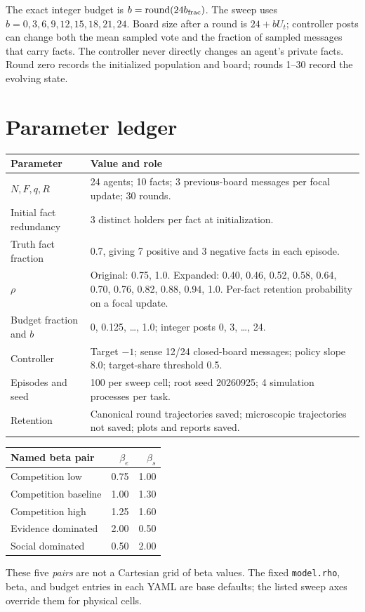 \documentclass[10pt,a4paper]{article}
\begin{document}
The exact integer budget is $b=\operatorname{round}(24b_{\rm frac})$. The sweep
uses $b=0,3,6,9,12,15,18,21,24$. Board size after a round is $24+bU_t$;
controller posts can change both the mean sampled vote and the fraction of
sampled messages that carry facts. The controller never directly changes an
agent's private facts. Round zero records the initialized population and
board; rounds 1--30 record the evolving state.

\section{Parameter ledger}
\begin{center}\begin{tabular}{p{47mm}p{105mm}}\toprule
Parameter & Value and role\\\midrule
$N,F,q,R$ & 24 agents; 10 facts; 3 previous-board messages per focal update; 30 rounds.\\
Initial fact redundancy & 3 distinct holders per fact at initialization.\\
Truth fact fraction & 0.7, giving 7 positive and 3 negative facts in each episode.\\
$\rho$ & Original: 0.75, 1.0. Expanded: 0.40, 0.46, 0.52, 0.58, 0.64, 0.70, 0.76, 0.82, 0.88, 0.94, 1.0. Per-fact retention probability on a focal update.\\
Budget fraction and $b$ & 0, 0.125, \ldots, 1.0; integer posts 0, 3, \ldots, 24.\\
Controller & Target $-1$; sense 12/24 closed-board messages; policy slope 8.0; target-share threshold 0.5.\\
Episodes and seed & 100 per sweep cell; root seed 20260925; 4 simulation processes per task.\\
Retention & Canonical round trajectories saved; microscopic trajectories not saved; plots and reports saved.\\
\bottomrule\end{tabular}\end{center}

\begin{center}\begin{tabular}{lrr}\toprule
Named beta pair & $\beta_e$ & $\beta_s$\\\midrule
Competition low & 0.75 & 1.00\\
Competition baseline & 1.00 & 1.30\\
Competition high & 1.25 & 1.60\\
Evidence dominated & 2.00 & 0.50\\
Social dominated & 0.50 & 2.00\\\bottomrule
\end{tabular}\end{center}
These five \emph{pairs} are not a Cartesian grid of beta values. The fixed
\texttt{model.rho}, beta, and budget entries in each YAML are base defaults;
the listed sweep axes override them for physical cells.
\end{document}
